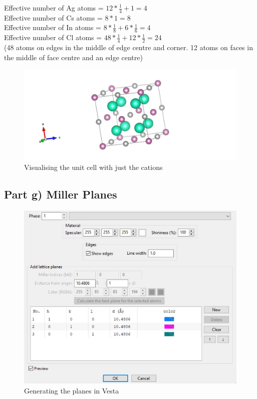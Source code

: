 \documentclass{homework}
\begin{document}
Effective number of Ag atoms = $12*\frac{1}{4} + 1 = 4$ \\
Effective number of Cs atoms = $8*1 = 8$ \\
Effective number of In atoms = $8*\frac{1}{8} + 6*\frac{1}{6} = 4$ \\
Effective number of Cl atoms = $48*\frac{1}{4} + 12*\frac{1}{2} = 24$\\
(48 atoms on edges in the middle of edge centre and corner. 12 atoms on faces in the middle of face centre and an edge centre)
\begin{figure}[ht]
\centering
\includegraphics[width=1\textwidth]{q1part_f_cations.jpg}
\caption{Visualising the unit cell with just the cations}
\label{Cations}
\end{figure}


\subsection*{Part g) Miller Planes}

\begin{figure}[!htb]
\centering
\includegraphics[width=1\textwidth]{part_g_key.jpg}
\caption{Generating the planes in Vesta}
\end{figure}
\end{document}
